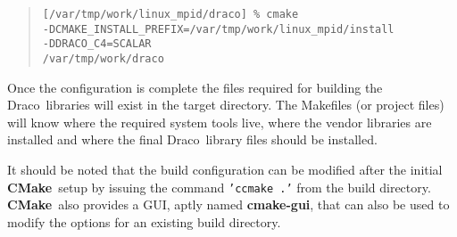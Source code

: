 \documentclass[11pt]{nmemo}
\newcommand{\comp}[1]{\normalfont\footnotesize\texttt{#1}\normalsize}
\newcommand{\draco}{{\normalfont\sffamily Draco}}
\newcommand{\metis}{{\normalfont\sffamily Metis}}
\newcommand{\cmake}{{\normalfont\bfseries CMake}}
\begin{document}
\footnotesize
\begin{verse}
\texttt{[/var/tmp/work/linux\_mpid/draco] \% cmake \\
  \hspace{0.5in}-DCMAKE\_INSTALL\_PREFIX=/var/tmp/work/linux\_mpid/install  \\
  \hspace{0.5in}-DDRACO\_C4=SCALAR \\
  \hspace{0.5in}/var/tmp/work/draco} \\
\end{verse}
\normalsize

Once the configuration is complete the files required for building the
\draco\ libraries will exist in the target directory.  The Makefiles
(or project files) will know where the required system tools live,
where the vendor libraries are installed and where the final
\draco\ library files should be installed.

It should be noted that the build configuration can be modified after
the initial \cmake\ setup by issuing the command \comp{'ccmake .'}
from the build directory.  \cmake\ also provides a GUI, aptly named
\textbf{cmake-gui}, that can also be used to modify the options for an
existing build directory. 





\end{document}
